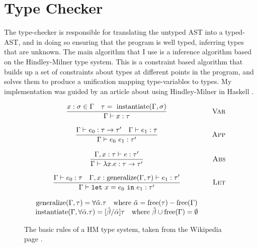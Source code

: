 \section{Type Checker}
The type-checker is responsible for translating the untyped AST into a typed-AST, and in doing so ensuring that the program is well typed, inferring types that are unknown. The main algorithm that I use is a inference algorithm based on the Hindley-Milner type system. This is a constraint based algorithm that builds up a set of constraints about types at different points in the program, and solves them to produce a unification mapping type-variables to types. My implementation was guided by an article about using Hindley-Milner in Haskell \cite{Hmi}.
\begin{figure}[h]
    $$\begin{array}{clr}
    \dfrac{x : \sigma \in \Gamma \quad \tau =\ \text{instantiate}(\Gamma, \sigma)}{\Gamma \vdash x : \tau} && \textsc{Var} \\\\
    \dfrac{\Gamma \vdash e_0 : \tau \rightarrow \tau' \quad \Gamma \vdash e_1 : \tau}{\Gamma \vdash e_0\ e_1 : \tau'} && \textsc{App} \\\\
    \dfrac{\Gamma, x : \tau \vdash e : \tau'}{\Gamma \vdash \lambda x . e : \tau \rightarrow \tau'} && \textsc{Abs} \\\\
    \dfrac{\Gamma \vdash e_0 : \tau \quad \Gamma, x : \text{generalize}(\Gamma, \tau) \vdash e_1 : \tau'}{\Gamma \vdash \mathtt{let}\ x = e_0\ \mathtt{in}\ e_1 : \tau'} && \textsc{Let} \\\\
    \text{generalize}(\Gamma, \tau) = \forall \hat{\alpha} . \tau \quad \text{where}\ \hat{\alpha} = \text{free}(\tau) - \text{free}(\Gamma) && \\
    \text{instantiate}(\Gamma, \forall \hat{\alpha} . \tau) = [\hat{\beta} / \hat{\alpha}]\tau \quad \text{where}\ \hat{\beta} \cup \text{free}(\Gamma) = \emptyset
    
\end{array}$$
\caption{The basic rules of a HM type system, taken from the Wikipedia page \cite{Hmts}.}
\label{fig:hm}
\end{figure}
